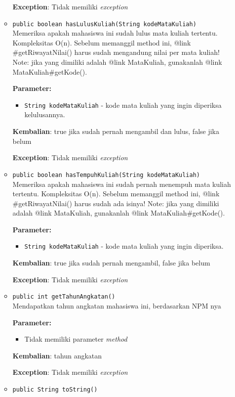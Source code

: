 \documentclass{article}
\begin{document}
\begin{enumerate}
\begin{itemize}
\textbf{Exception}: Tidak memiliki \textit{exception}

\item \texttt{public boolean hasLulusKuliah(String kodeMataKuliah)}\\ 
Memeriksa apakah mahasiswa ini sudah lulus mata kuliah tertentu. Kompleksitas O(n).
 Sebelum memanggil method ini, {@link #getRiwayatNilai()} harus sudah mengandung nilai per mata kuliah!
 Note: jika yang dimiliki adalah {@link MataKuliah}, gunakanlah {@link MataKuliah#getKode()}.

\textbf{Parameter:}
\begin{itemize}
\item \texttt{String kodeMataKuliah} - 
kode mata kuliah yang ingin diperiksa kelulusannya.
\end{itemize}
\textbf{Kembalian}: true jika sudah pernah mengambil dan lulus, false jika belum

\textbf{Exception}: Tidak memiliki \textit{exception}

\item \texttt{public boolean hasTempuhKuliah(String kodeMataKuliah)}\\ 
Memeriksa apakah mahasiswa ini sudah pernah menempuh mata kuliah tertentu. Kompleksitas O(n).
 Sebelum memanggil method ini, {@link #getRiwayatNilai()} harus sudah ada isinya!
 Note: jika yang dimiliki adalah {@link MataKuliah}, gunakanlah {@link MataKuliah#getKode()}.

\textbf{Parameter:}
\begin{itemize}
\item \texttt{String kodeMataKuliah} - 
kode mata kuliah yang ingin diperiksa.
\end{itemize}
\textbf{Kembalian}: true jika sudah pernah mengambil, false jika belum

\textbf{Exception}: Tidak memiliki \textit{exception}

\item \texttt{public int getTahunAngkatan()}\\ 
Mendapatkan tahun angkatan mahasiswa ini, berdasarkan NPM nya

\textbf{Parameter:}\begin{itemize}
\item Tidak memiliki parameter \textit{method}
\end{itemize}
\textbf{Kembalian}: tahun angkatan

\textbf{Exception}: Tidak memiliki \textit{exception}

\item \texttt{public String toString()}\\ 



\end{itemize}
\end{enumerate}
\end{document}
